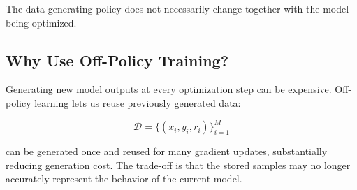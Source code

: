 \documentclass[11pt]{article}
\begin{document}
The data-generating policy does not necessarily change together with the model being optimized.

\subsection*{Why Use Off-Policy Training?}

Generating new model outputs at every optimization step can be expensive. Off-policy learning lets us reuse previously generated data:

\[
\mathcal{D} = \{(x_i,y_i,r_i)\}_{i=1}^{M}
\]

can be generated once and reused for many gradient updates, substantially reducing generation cost. The trade-off is that the stored samples may no longer accurately represent the behavior of the current model.
\end{document}
